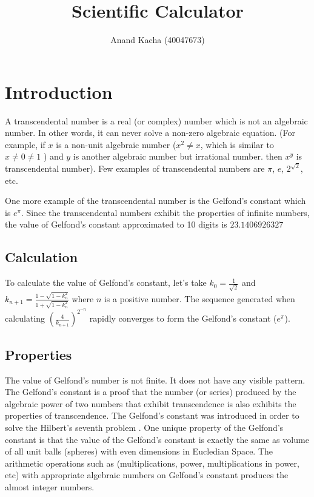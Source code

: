 \documentclass{article}
\title{Scientific Calculator}
\author{Anand Kacha (40047673)}
\begin{document}
\maketitle

\tableofcontents
\listoffigures

\clearpage

\section{Introduction}
\justifying
A transcendental number \cite{transcendental} is a real (or complex) number which is not an algebraic number. In other words, it can never solve a non-zero algebraic equation. (For example, if $x$ is a non-unit algebraic number ($x^2 \ne x$, which is similar to $x \ne 0 \ne 1$ ) and $y$ is another algebraic number but irrational number. then $x^y$ is transcendental number). Few examples of transcendental numbers are $\pi$, $e$, $2^{\sqrt{2}}$, etc.
\begin{flushleft}
\justifying
One more example of the transcendental number is the Gelfond's constant \cite{gelfondsconstant} which is $e^{\pi}$. Since the transcendental numbers exhibit the properties of infinite numbers, the value of Gelfond's constant approximated to 10 digits is $23.1406926327$
\end{flushleft}

\subsection{Calculation}
\begin{flushleft}
\justifying
To calculate the value of Gelfond's constant, let's take $k_0 = \frac{1}{\sqrt{2}}$ and $k_{n+1} = \frac{1 - \sqrt{1 - k_n^2}}{1 + \sqrt{1 - k_n^2}}$ where $n$ is a positive number. The sequence generated when calculating $(\frac{4}{k_{n+1}})^{2^{-n}}$ rapidly converges to form the Gelfond's constant ($e^\pi$).
\end{flushleft}

\subsection{Properties}
\begin{flushleft}
\justifying
The value of Gelfond's number is not finite. It does not have any visible pattern. The Gelfond's constant is a proof that the number (or series) produced by the algebraic power of two numbers that exhibit transcendence is also exhibits the properties of transcendence. The Gelfond's constant was introduced in order to solve the Hilbert's seventh problem \cite{hilbertsproblems}. One unique property of the Gelfond's constant is that the value of the Gelfond's constant is exactly the same as volume of all unit balls (spheres) with even dimensions in Eucledian Space. The arithmetic operations such as (multiplications, power, multiplications in power, etc) with appropriate algebraic numbers on Gelfond's constant produces the almost integer numbers.
\end{flushleft}
\end{document}
